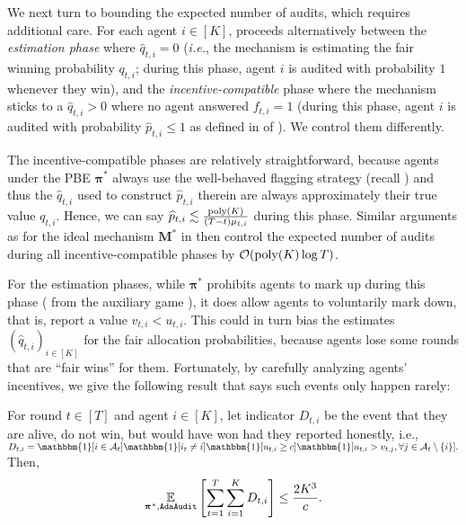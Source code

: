 We next turn to bounding the expected number of audits, which requires additional care. For each agent $i\in[K]$, \mechname proceeds alternatively between the \textit{estimation phase} where $\hat q_{t,i}=0$ (\textit{i.e.}, the mechanism is estimating the fair winning probability $q_{t,i}$; during this phase, agent $i$ is audited with probability $1$ whenever they win), and the \textit{incentive-compatible} phase where the mechanism sticks to a $\hat q_{t,i}>0$ where no agent answered $f_{t,i}=1$ (during this phase, agent $i$ is audited with probability $\hat p_{t,i}\leq 1$ as defined in  of ). We control them differently.

The incentive-compatible phases are relatively straightforward, because agents under the PBE $\bm \pi^\ast$ always use the well-behaved flagging strategy (recall ) and thus the $\hat q_{t,i}$ used to construct $\hat p_{t,i}$ therein are always approximately their true value $q_{t,i}$. Hence, we can say $\widehat p_{t,i}\lesssim \frac{\mathrm{poly}(K)}{(T-t)\mu_{t,i}}$ during this phase. Similar arguments as for the ideal mechanism $\bm M^\ast$ in  then control the expected number of audits during all incentive-compatible phases by $\operatorname{\mathcal O}(\mathrm{poly}(K) \log T)$.

For the estimation phases, while $\bm\pi^\ast$ prohibits agents to mark up during this phase ( from the auxiliary game ), it does allow agents to voluntarily mark down, that is, report a value $v_{t,i}<u_{t,i}$. This could in turn bias the estimates $(\hat q_{t,i})_{i\in[K]}$ for the fair allocation probabilities, because agents lose some rounds that are ``fair wins'' for them.
Fortunately, by carefully analyzing agents' incentives, we give the following result that says such events only happen rarely:
\begin{lemma}\label{lem:number of marking down bound}
For round $t\in [T]$ and agent $i\in [K]$, let indicator $D_{t,i}$ be the event that they are alive, do not win, but would have won had they reported honestly, i.e.,
$D_{t,i}=\mathbbm{1}[i\in \mA_t]\mathbbm{1}[i_t\ne i]\mathbbm{1}[u_{t,i}\geq c]\mathbbm{1}[u_{t,i}>v_{t,j},\forall j\in \mA_t\setminus\{i\}].$
Then,
\begin{equation*}
\E_{\bm\pi^\ast,\mechname}\sqb{\sum_{t=1}^T \sum_{i=1}^K D_{t,i}} \leq \frac{2K^3}{c}.
\end{equation*}
\end{lemma}

